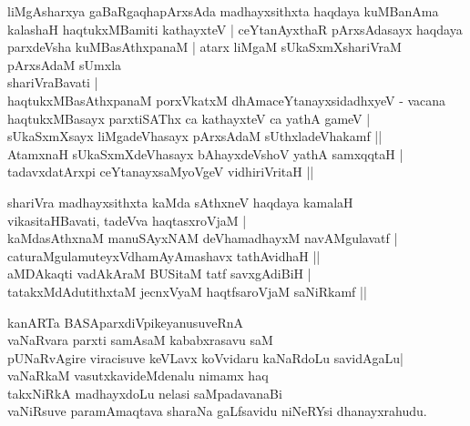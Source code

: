 \begin{entry}
\smallskip

\begin{shl}
liMgAsharxya gaBaRgaqhapArxsAda madhayxsithxta haqdaya kuMBanAma\\
kalashaH haqtukxMBamiti kathayxteV | ceYtanAyxthaR pArxsAdasayx haqdaya\\
parxdeVsha kuMBasAthxpanaM | atarx liMgaM sUkaSxmXshariVraM pArxsAdaM sUmxla\\
shariVraBavati |\\
haqtukxMBasAthxpanaM porxVkatxM dhAmaceYtanayxsidadhxyeV - vacana\\
haqtukxMBasayx parxtiSAThx ca kathayxteV ca yathA gameV |\\
sUkaSxmXsayx liMgadeVhasayx pArxsAdaM sUthxladeVhakamf ||\\
AtamxnaH sUkaSxmXdeVhasayx bAhayxdeVshoV yathA samxqqtaH |\\
tadavxdatArxpi ceYtanayxsaMyoVgeV vidhiriVritaH ||
\end{shl}
\smallskip
{}
\end{entry}

\begin{entry}
\smallskip

\begin{shl}
shariVra madhayxsithxta kaMda sAthxneV haqdaya kamalaH\\
vikasitaHBavati, tadeVva haqtasxroVjaM |\\
kaMdasAthxnaM manuSAyxNAM deVhamadhayxM navAMgulavatf |\\
caturaMgulamuteyxVdhamAyAmashavx tathAvidhaH ||\\
aMDAkaqti vadAkAraM BUSitaM tatf savxgAdiBiH |\\
tatakxMdAdutithxtaM jecnxVyaM haqtfsaroVjaM saNiRkamf ||
\end{shl}
\smallskip
{}
\end{entry}

\begin{entry}
\smallskip

\begin{shl}
kanARTa BASAparxdiVpikeyanusuveRnA\\
vaNaRvara parxti samAsaM kababxrasavu saM\\
pUNaRvAgire viracisuve keVLavx koVvidaru kaNaRdoLu savidAgaLu|\\
vaNaRkaM vasutxkavideMdenalu nimamx haq\\
takxNiRkA madhayxdoLu nelasi saMpadavanaBi\\
vaNiRsuve paramAmaqtava sharaNa gaLfsavidu niNeRYsi dhanayxrahudu.
\end{shl}
\smallskip
{}
\end{entry}

